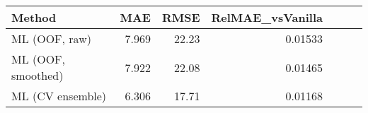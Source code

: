 \begin{tabular}{lrrrrrr}
\hline
Method & MAE & RMSE & RelMAE_vsVanilla \\ \hline
ML (OOF, raw) & 7.969 & 22.23 & 0.01533 \\
ML (OOF, smoothed) & 7.922 & 22.08 & 0.01465 \\
ML (CV ensemble) & 6.306 & 17.71 & 0.01168 \\
\hline
\end{tabular}
